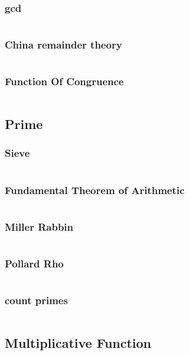 \documentclass[a4paper,10pt]{article}
\begin{document}
                \subsubsection{gcd}
                    \inputminted[breaklines]{c++}{Math/exgcd.cc}
                \subsubsection{China remainder theory}
                    \inputminted[breaklines]{c++}{Math/CRT.cc}
                \subsubsection{Function Of Congruence}
                    \inputminted[breaklines]{c++}{Math/function-of-Congruence.cc}
                    
			\subsection{Prime}
                \subsubsection{Sieve}
                    \inputminted[breaklines]{c++}{Math/sieve.cc}
                \subsubsection{Fundamental Theorem of Arithmetic}
                    \inputminted[breaklines]{c++}{Math/Fundamental-Theorem-of-Arithmetic.cc}
				\subsubsection{Miller Rabbin}
					\inputminted[breaklines]{c++}{Math/miller-rabbin.cc}
				\subsubsection{Pollard Rho}
					\inputminted[breaklines]{c++}{Math/pollard_rho.cc}
                \subsubsection{count primes}
                    \inputminted[breaklines]{c++}{Math/Meissel-Lehmer.cc}
					
			\subsection{Multiplicative Function}
\end{document}
